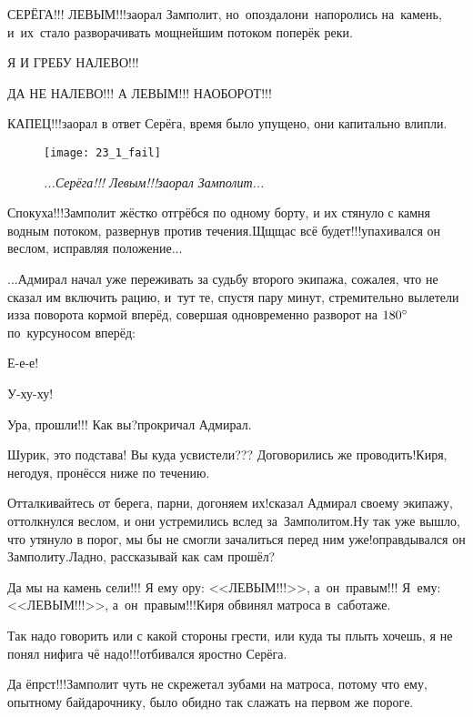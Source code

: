 \diagdash СЕРЁГА!!! ЛЕВЫМ!!!\mdash заорал Замполит, но~опоздал\mdash они~напоролись на~камень, и~их~стало разворачивать мощнейшим потоком поперёк реки.

\diagdash Я И ГРЕБУ НАЛЕВО!!!

\diagdash ДА НЕ НАЛЕВО!!! А ЛЕВЫМ!!! НАОБОРОТ!!!

\diagdash КАПЕЦ!!!\mdash заорал в ответ Серёга, время было упущено, они капитально влипли.

\begin{figure}[h]
	\centering
	\texttt{[image: 23\_1\_fail]}
	\caption{\small\textit{...Серёга!!! Левым!!!\mdash заорал Замполит...}}
\end{figure}

\diagdash Спокуха!!!\mdash Замполит жёстко отгрёбся по одному борту, и их стянуло с камня водным потоком, развернув против течения.\mdash Щ\sdash щ\sdash щас всё будет!!!\mdash упахивался он веслом, исправляя положение$\ldots$

\vspace{0.3cm}
$\ldots$Адмирал начал уже переживать за судьбу второго экипажа, сожалея, что не сказал им включить рацию, и~тут те, спустя пару минут, стремительно вылетели из\sdash за поворота кормой вперёд, совершая одновременно разворот на $180\degree$ по~курсу\mdash носом вперёд:

\diagdash Е-е-е!

\diagdash У-ху-ху!

\diagdash Ура, прошли!!! Как вы?\mdash прокричал Адмирал.

\diagdash Шурик, это подстава! Вы куда усвистели??? Договорились же проводить!\mdash Киря, негодуя, пронёсся ниже по течению.

\diagdash Отталкивайтесь от берега, парни, догоняем их!\mdash сказал Адмирал своему экипажу, оттолкнулся веслом, и они устремились вслед за~Замполитом.\mdash Ну так уже вышло, что утянуло в порог, мы бы не смогли зачалиться перед ним уже!\mdash оправдывался он Замполиту.\mdash Ладно, рассказывай как сам прошёл?

\diagdash Да мы на камень сели!!! Я ему ору: <<ЛЕВЫМ!!!>>, а~он~правым!!! Я~ему: <<ЛЕВЫМ!!!>>, а~он~правым!!!\mdash Киря обвинял матроса в~саботаже.

\diagdash Так надо говорить или с какой стороны грести, или куда ты плыть хочешь, я не понял нифига чё надо!!!\mdash отбивался яростно Серёга.

\diagdash Да ёпрст!!!\mdash Замполит чуть не скрежетал зубами на матроса, потому что ему, опытному байдарочнику, было обидно так слажать на первом же пороге.

